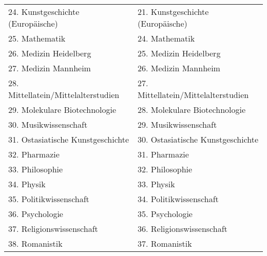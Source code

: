 {\begin{longtable}{|p{7.5cm}|p{7.5cm}|}
        24. Kunstgeschichte (Europäische)                                & 21. Kunstgeschichte (Europäische)                                \\
        25. Mathematik                                                   & 24. Mathematik                                                   \\
        26. Medizin Heidelberg                                           & 25. Medizin Heidelberg                                           \\
        27. Medizin Mannheim                                             & 26. Medizin Mannheim                                             \\
        28. Mittellatein/Mittelalterstudien                              & 27. Mittellatein/Mittelalterstudien                              \\
        29. Molekulare Biotechnologie                                    & 28. Molekulare Biotechnologie                                    \\
        30. Musikwissenschaft                                            & 29. Musikwissenschaft                                            \\
        31. Ostasiatische Kunstgeschichte                                & 30. Ostasiatische Kunstgeschichte                                \\
        32. Pharmazie                                                    & 31. Pharmazie                                                    \\
        33. Philosophie                                                  & 32. Philosophie                                                  \\
        34. Physik                                                       & 33. Physik                                                       \\
        35. Politikwissenschaft                                          & 34. Politikwissenschaft                                          \\
        36. Psychologie                                                  & 35. Psychologie                                                  \\
        37. Religionswissenschaft                                        & 36. Religionswissenschaft                                        \\
        38. Romanistik                                                   & 37. Romanistik                                                   \\

\end{longtable}}
